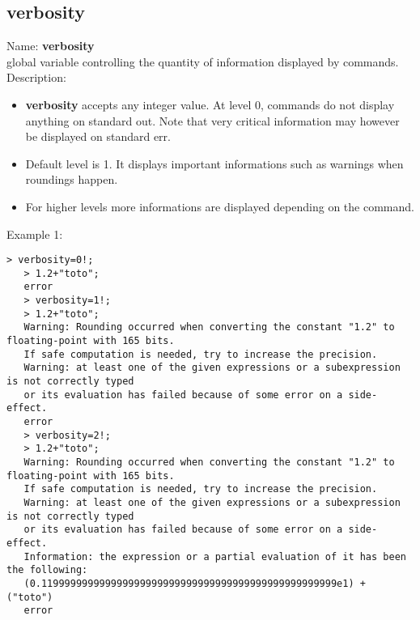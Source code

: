 \subsection{ verbosity }
\noindent Name: \textbf{verbosity}\\
global variable controlling the quantity of information displayed by commands.\\

\noindent Description: \begin{itemize}

\item \textbf{verbosity} accepts any integer value. At level 0, commands do not display anything
   on standard out. Note that very critical information may however be displayed on
   standard err.

\item Default level is 1. It displays important informations such as warnings when 
   roundings happen.

\item For higher levels more informations are displayed depending on the command.
\end{itemize}
\noindent Example 1: 
\begin{center}\begin{minipage}{14.8cm}\begin{Verbatim}[frame=single]
   > verbosity=0!;
   > 1.2+"toto";
   error
   > verbosity=1!;
   > 1.2+"toto";
   Warning: Rounding occurred when converting the constant "1.2" to floating-point with 165 bits.
   If safe computation is needed, try to increase the precision.
   Warning: at least one of the given expressions or a subexpression is not correctly typed
   or its evaluation has failed because of some error on a side-effect.
   error
   > verbosity=2!;
   > 1.2+"toto";
   Warning: Rounding occurred when converting the constant "1.2" to floating-point with 165 bits.
   If safe computation is needed, try to increase the precision.
   Warning: at least one of the given expressions or a subexpression is not correctly typed
   or its evaluation has failed because of some error on a side-effect.
   Information: the expression or a partial evaluation of it has been the following:
   (0.119999999999999999999999999999999999999999999999999e1) + ("toto")
   error
\end{Verbatim}
\end{minipage}\end{center}
